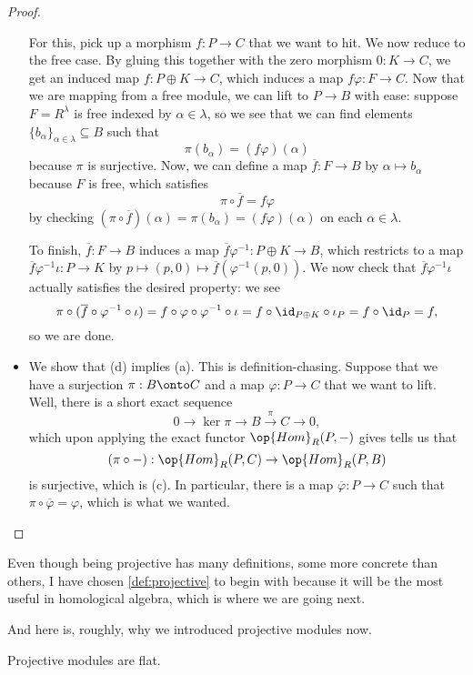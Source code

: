 \begin{proof}
\begin{itemize}
		For this, pick up a morphism $f:P\to C$ that we want to hit. We now reduce to the free case. By gluing this together with the zero morphism $0:K\to C$, we get an induced map $f:P\oplus K\to C$, which induces a map $f\varphi:F\to C$. Now that we are mapping from a free module, we can lift to $P\to B$ with ease: suppose $F=R^\lambda$ is free indexed by $\alpha\in\lambda$, so we see that we can find elements $\{b_\alpha\}_{\alpha\in\lambda}\subseteq B$ such that
		\[\pi(b_\alpha)=(f\varphi)(\alpha)\]
		because $\pi$ is surjective. Now, we can define a map $\overline f:F\to B$ by $\alpha\mapsto b_\alpha$ because $F$ is free, which satisfies
		\[\pi\circ\overline f=f\varphi\]
		by checking $(\pi\circ\overline f)(\alpha)=\pi(b_\alpha)=(f\varphi)(\alpha)$ on each $\alpha\in\lambda$.

		To finish, $\overline f:F\to B$ induces a map $\overline f\varphi^{-1}:P\oplus K\to B$, which restricts to a map $\overline f\varphi^{-1}\iota:P\to K$ by $p\mapsto(p,0)\mapsto\overline f(\varphi^{-1}(p,0))$. We now check that $\overline f\varphi^{-1}\iota$ actually satisfies the desired property: we see
		\[\pi\circ(\overline f\circ\varphi^{-1}\circ\iota)=f\circ\varphi\circ\varphi^{-1}\circ\iota=f\circ\id_{P\oplus K}\circ\iota_P=f\circ\id_P=f,\]
		so we are done.

		\item We show that (d) implies (a). This is definition-chasing. Suppose that we have a surjection $\pi:B\onto C$ and a map $\varphi:P\to C$ that we want to lift. Well, there is a short exact sequence
		\[0\to\ker\pi\to B\stackrel\pi\to C\to 0,\]
		which upon applying the exact functor $\op{Hom}_R(P,-)$ gives tells us that
		\[(\pi\circ-):\op{Hom}_R(P,C)\to\op{Hom}_R(P,B)\]
		is surjective, which is (c). In particular, there is a map $\overline\varphi:P\to C$ such that $\pi\circ\overline\varphi=\varphi$, which is what we wanted.
		\qedhere
	\end{itemize}
\end{proof}
\begin{remark}[Nir]
	Even though being projective has many definitions, some more concrete than others, I have chosen \autoref{def:projective} to begin with because it will be the most useful in homological algebra, which is where we are going next.
\end{remark}
And here is, roughly, why we introduced projective modules now.
\begin{prop}
	Projective modules are flat.
\end{prop}

